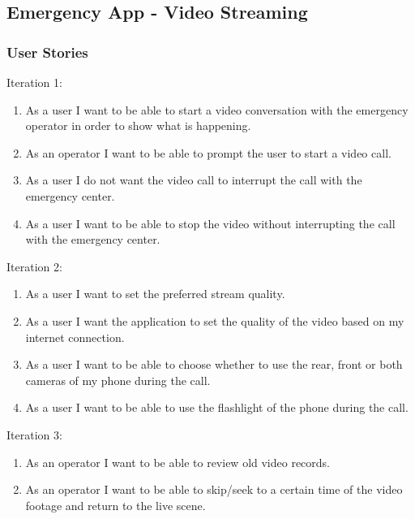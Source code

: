 \documentclass{article}
\begin{document}
\pagebreak
	\subsection{Emergency App - Video Streaming}
	\subsubsection{User Stories}
	Iteration 1:
	\begin{enumerate}
	\item As a user I want to be able to start a video conversation with the emergency operator in order to show what is happening.
\item As an operator I want to be able to prompt the user to start a video call.
\item As a user I do not want the video call to interrupt the call with the emergency center.
\item As a user I want to be able to stop the video without interrupting the call with the emergency center.

	\end{enumerate}
	
	Iteration 2:
	\begin{enumerate}
	\item As a user I want to set the preferred stream quality.
\item As a user I want the application to set the quality of the video based on my internet connection.
\item As a user I want to be able to choose whether to use the rear, front or both cameras of my phone during the call.
\item As a user I want to be able to use the flashlight of the phone during the call.

	\end{enumerate}

	Iteration 3:
	\begin{enumerate}
	\item As an operator I want to be able to review old video records.
\item As an operator I want to be able to skip/seek to a certain time of the video footage and return to the live scene.

\end{enumerate}		
	
\end{document}

